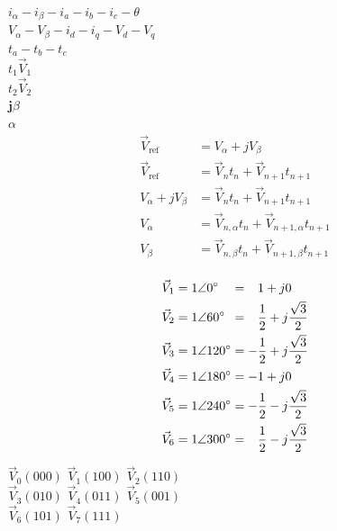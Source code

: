 \documentclass[11pt]{report}
\begin{document}
\begin{center}
	$ i_{\alpha} - i_{\beta} - i_a - i_b - i_c - \theta$ \\
	$ V_{\alpha} - V_{\beta} - i_d - i_q - V_d - V_q $ \\
	$ t_a - t_b - t_c $ \\
	$t_1\vec{V}_1$ \\
	$t_2\vec{V}_2$ \\
	$\mathbf{j}\beta$ \\
	$\alpha$\\


	\begin{align*}
		\vec{V}_{\text{ref}}    & = V_{\alpha} + jV_{\beta}                             \\
		\vec{V}_{\text{ref}}    & = \vec{V}_nt_n + \vec{V}_{n+1}t_{n+1}                 \\
		V_{\alpha} + jV_{\beta} & = \vec{V}_nt_n + \vec{V}_{n+1}t_{n+1}                 \\
		V_{\alpha}              & = \vec{V}_{n,\alpha}t_n + \vec{V}_{n+1,\alpha}t_{n+1} \\
		V_{\beta}               & = \vec{V}_{n,\beta}t_n + \vec{V}_{n+1,\beta}t_{n+1}   \\
	\end{align*}

	\begin{center}
		\begin{align}
			\vec{V}_1 & = 1 \angle 0^\circ \hphantom{00} = \hphantom{-} 1 + j0                            \\
			\vec{V}_2 & = 1 \angle 60^\circ \hphantom{0} = \hphantom{-} \frac{1}{2} + j\frac{\sqrt{3}}{2} \\
			\vec{V}_3 & = 1 \angle 120^\circ = -\frac{1}{2} + j\frac{\sqrt{3}}{2}                         \\
			\vec{V}_4 & = 1 \angle 180^\circ = -1 + j0                                                    \\
			\vec{V}_5 & = 1 \angle 240^\circ = -\frac{1}{2} - j\frac{\sqrt{3}}{2}                         \\
			\vec{V}_6 & = 1 \angle 300^\circ = \hphantom{-} \frac{1}{2} - j\frac{\sqrt{3}}{2}
		\end{align}
	\end{center}


	$\vec{V}_0(000)$ 
	$\vec{V}_1(100)$ 
	$\vec{V}_2(110)$ \\
	$\vec{V}_3(010)$ 
	$\vec{V}_4(011)$ 
	$\vec{V}_5(001)$ \\
	$\vec{V}_6(101)$ 
	$\vec{V}_7(111)$ 


\end{center}
\end{document}
